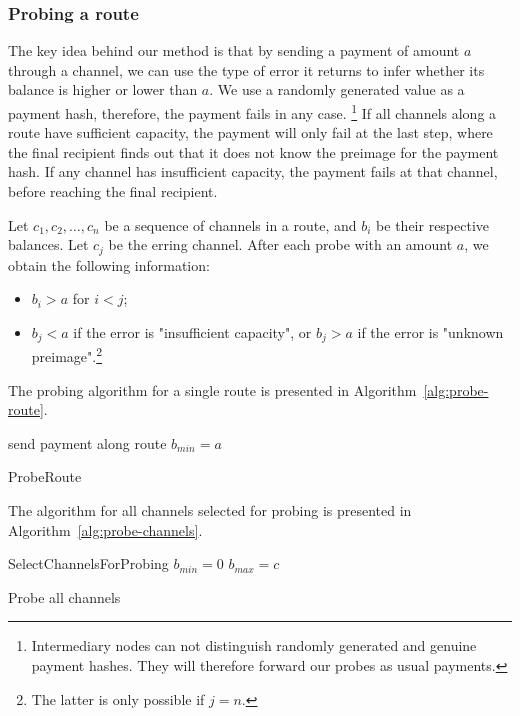 \subsubsection*{Probing a route}
The key idea behind our method is that by sending a payment of amount $a$ through a channel, we can use the type of error it returns to infer whether its balance is higher or lower than $a$.
We use a randomly generated value as a payment hash, therefore, the payment fails in any case.
\footnote{Intermediary nodes can not distinguish randomly generated and genuine payment hashes.
They will therefore forward our probes as usual payments.}
If all channels along a route have sufficient capacity, the payment will only fail at the last step, where the final recipient finds out that it does not know the preimage for the payment hash.
If any channel has insufficient capacity, the payment fails at that channel, before reaching the final recipient.

Let $c_1, c_2, \dots, c_n$ be a sequence of channels in a route, and $b_i$ be their respective balances.
Let $c_j$ be the erring channel.
After each probe with an amount $a$, we obtain the following information:
\begin{itemize}
	\item $b_i > a$ for $i<j$;
	\item $b_j < a$ if the error is "insufficient capacity", or $b_j > a$ if the error is "unknown preimage".\footnote{The latter is only possible if $j=n$.}
\end{itemize}

The probing algorithm for a single route is presented in Algorithm~\ref{alg:probe-route}.

\begin{algorithm}
	send payment along route\;
	 {
		$b_{min} = a$\;
	}
	\caption{ProbeRoute}
	\label{alg:probe-route}
\end{algorithm}

The algorithm for all channels selected for probing is presented in Algorithm~\ref{alg:probe-channels}.

\begin{algorithm}
	SelectChannelsForProbing\;
	 {	
		$b_{min} = 0$\;
		$b_{max} = c$\;
		 {
		}
	}
	\caption{Probe all channels}
	\label{alg:probe-channels}
\end{algorithm}


